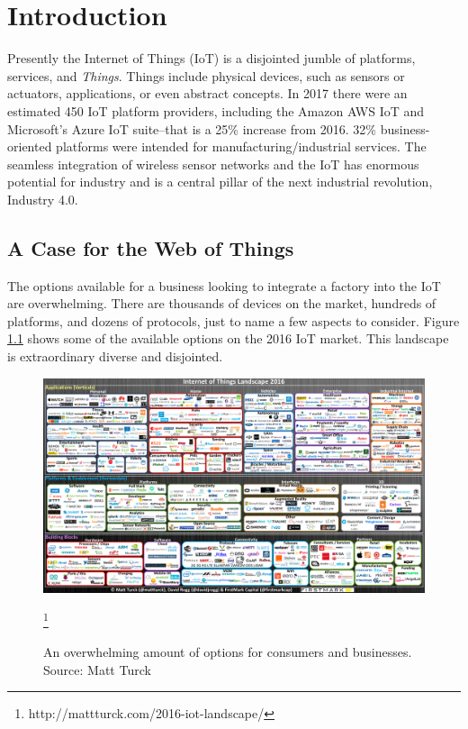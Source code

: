 \chapter{Introduction}

Presently the Internet of Things (IoT) is a disjointed jumble of platforms, services, and \textit{Things}. Things include physical devices, such as sensors or actuators, applications, or even abstract concepts. In 2017 there were an estimated 450 IoT platform providers, including the Amazon AWS IoT and Microsoft's Azure IoT suite--that is a 25\% increase from 2016. 32\%  business-oriented platforms were intended for manufacturing/industrial services\cite{Williams.2017}. The seamless integration of wireless sensor networks and the IoT has enormous potential for industry and is a central pillar of the next industrial revolution, Industry 4.0.\cite{wang2016implementing}




\section{A Case for the Web of Things}

The options available for a business looking to integrate a factory into the IoT are overwhelming. There are thousands of devices on the market, hundreds of platforms, and dozens of protocols, just to name a few aspects to consider. Figure \ref{fig:IoT-landscape} shows some of the available options on the 2016 IoT market. This landscape is extraordinary diverse and disjointed.

\begin{figure}[th]
\centering
\includegraphics[width=\textwidth]{Figures/IoT-landscape}
\caption[Platforms and Options for the IoT in 2016]{An overwhelming amount of options for consumers and businesses. Source: Matt Turck}
\label{fig:IoT-landscape}
\footnote{http://mattturck.com/2016-iot-landscape/}
\end{figure}


